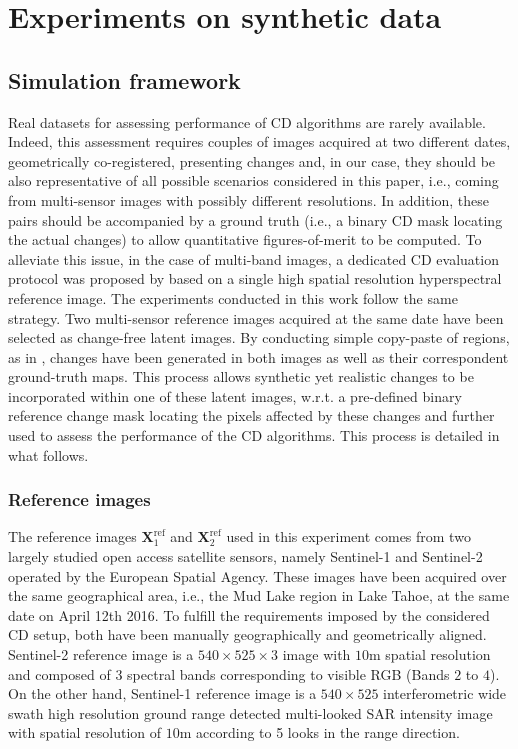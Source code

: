 \documentclass[review]{elsarticle}
\begin{document}
\section{Experiments on synthetic data}
\label{sec:experiments}

\subsection{Simulation framework}
	
Real datasets for assessing performance of CD algorithms are rarely available. Indeed, this assessment requires couples of images acquired at two different dates, geometrically co-registered, presenting changes and, in our case, they should be also representative of all possible scenarios considered in this paper, i.e., coming from multi-sensor images with possibly different resolutions. In addition, these pairs should be accompanied by a ground truth (i.e., a binary CD mask locating the actual changes) to allow quantitative figures-of-merit to be computed. To alleviate this issue, in the case of multi-band images, a dedicated CD evaluation protocol was proposed by \citet{ferraris_detecting_2017} based on a single high spatial resolution hyperspectral reference image. The experiments conducted in this work follow the same strategy. Two multi-sensor reference images acquired at the same date have been selected as change-free latent images. By conducting simple copy-paste of regions, as in \citet{ferraris_detecting_2017}, changes have been generated in both images as well as their correspondent ground-truth maps. This process allows synthetic yet realistic changes to be incorporated within one of these latent images, w.r.t. a pre-defined binary reference change mask locating the pixels affected by these changes and further used to assess the performance of the CD algorithms. This process is detailed in what follows.

\subsubsection{Reference images}
\label{subsubsec:sim_reference_images}

The reference images $\mathbf{X}^{\mathrm{ref}}_{1}$ and $\mathbf{X}^{\mathrm{ref}}_{2}$ used in this experiment comes from two largely studied open access satellite sensors, namely Sentinel-1 \citep{european_space_agency_sentinel-1_2017} and Sentinel-2 \citep{european_space_agency_sentinel-2_2017} operated by the European Spatial Agency. These images have been acquired over the same geographical area, i.e., the Mud Lake region in Lake Tahoe, at the same date on April 12th 2016. To fulfill the requirements imposed by the considered CD setup, both have been manually geographically and geometrically aligned. Sentinel-2 reference image is a $540 \times 525 \times 3$ image with $10$m spatial resolution and composed of $3$ spectral bands corresponding to visible RGB (Bands $2$ to $4$). On the other hand, Sentinel-1 reference image is a $540 \times 525$ interferometric wide swath high resolution ground range detected multi-looked SAR intensity image with spatial resolution of $10$m according to 5 looks in the range direction.
\end{document}
